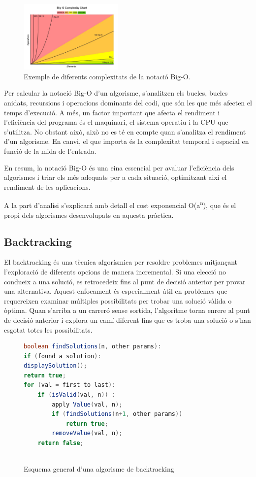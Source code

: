\documentclass{ieeetj}
\begin{document}
\begin{figure}[htbp]
\centerline{\includegraphics[width=0.45\textwidth]{png/bigO.png}}
\caption{Exemple de diferents complexitats de la notació Big-O.}
\label{fig:big_o}
\end{figure}

Per calcular la notació Big-O d'un algorisme, s'analitzen els bucles, bucles anidats, recursions i operacions dominants del codi, que són les que més afecten el temps d'execució. A més, un factor important que afecta el rendiment i l'eficiència del programa és el maquinari, el sistema operatiu i la CPU que s'utilitza. No obstant això, això no es té en compte quan s'analitza el rendiment d'un algorisme. En canvi, el que importa és la complexitat temporal i espacial en funció de la mida de l'entrada.

En resum, la notació Big-O és una eina essencial per avaluar l'eficiència dels algorismes i triar els més adequats per a cada situació, optimitzant així el rendiment de les aplicacions.

A la part d'analisi s'explicará amb detall el cost exponencial O(a\textsuperscript{n}), que és el propi dels algorismes desenvolupats en aquesta pràctica.
 
\subsection{Backtracking}
El backtracking és una tècnica algorísmica per resoldre problemes mitjançant l'exploració de diferents opcions de manera incremental. Si una elecció no condueix a una solució, es retrocedeix fins al punt de decisió anterior per provar una alternativa. Aquest enfocament és especialment útil en problemes que requereixen examinar múltiples possibilitats per trobar una solució vàlida o òptima. Quan s'arriba a un carreró sense sortida, l'algoritme torna enrere al punt de decisió anterior i explora un camí diferent fins que es troba una solució o s'han esgotat totes les possibilitats.

\begin{figure}[H]
\centering
\begin{lstlisting}[language=Java, basicstyle=\ttfamily\small]
boolean findSolutions(n, other params):
if (found a solution):
displaySolution();
return true;
for (val = first to last): 
    if (isValid(val, n)) :
        apply Value(val, n);
        if (findSolutions(n+1, other params))
            return true;
        removeValue(val, n);
    return false;
    
\end{lstlisting}

\caption{Esquema general d'una algorisme de backtracking}
\label{fig:f1}
\end{figure}
\end{document}
